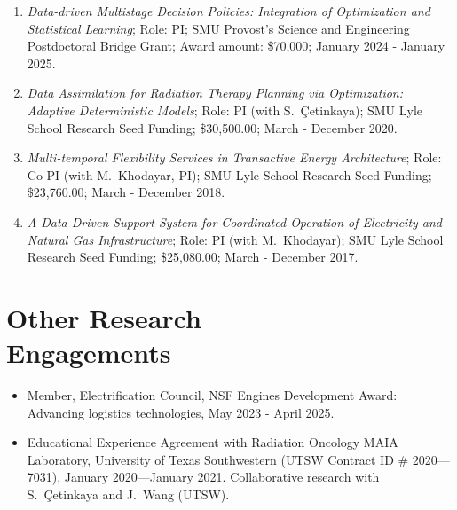\documentclass[hyperref, margin]{myResume}
\begin{document}
\begin{resume}
\begin{enumerate}[label=G\arabic*., leftmargin=*]
	\item \emph{Data-driven Multistage Decision Policies: Integration of Optimization and Statistical Learning}; Role: PI; SMU Provost's Science and Engineering Postdoctoral Bridge Grant; Award amount: \$70,000; January 2024 - January 2025.

	\item \emph{Data Assimilation for Radiation Therapy Planning via Optimization: Adaptive Deterministic Models}; Role: PI (with S.\ \c{C}etinkaya); SMU Lyle School Research Seed Funding; \$30,500.00; March - December 2020.

	\item \emph{Multi-temporal Flexibility Services in Transactive Energy Architecture}; Role: Co-PI (with M.\ Khodayar, PI); SMU Lyle School Research Seed Funding; \$23,760.00; March - December 2018.

	\item \emph{A Data-Driven Support System for Coordinated Operation of Electricity and Natural Gas Infrastructure}; Role: PI (with M.\ Khodayar); SMU Lyle School Research Seed Funding; \$25,080.00; March - December 2017.
\end{enumerate}

\section{Other Research\\Engagements}
\begin{itemize}[leftmargin=17pt]
	\item Member, Electrification Council, NSF Engines Development Award: Advancing logistics technologies, May 2023 - April 2025.
	\item Educational Experience Agreement with Radiation Oncology MAIA Laboratory, University of Texas Southwestern (UTSW Contract ID \# 2020—7031), January 2020—January 2021. Collaborative research with S.\ \c{C}etinkaya and J.\ Wang (UTSW).
\end{itemize}


\end{resume}
\end{document}
